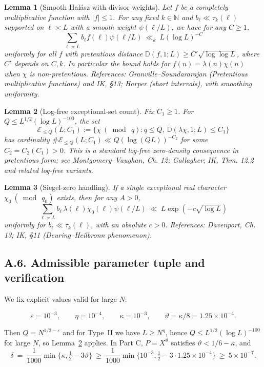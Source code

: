 \documentclass[11pt]{article}
\newtheorem{lemma}{Lemma}[section]
\theoremstyle{definition}
\theoremstyle{remark}
\begin{document}
\begin{lemma}[Smooth Hal\'asz with divisor weights]\label{lem:halasz-smooth}
	Let $f$ be a completely multiplicative function with $|f|\le 1$. For any fixed $k\in\mathbb N$ and $b_\ell\ll \tau_k(\ell)$ supported on $\ell\asymp L$ with a smooth weight $\psi(\ell/L)$, we have for any $C\ge 1$,
	\[
		\sum_{\ell\asymp L} b_\ell f(\ell)\psi(\ell/L)\ \ll_{k}\ L(\log L)^{-C}
	\]
	uniformly for all $f$ with pretentious distance $\mathbb D(f,1;L)\ge C'\sqrt{\log\log L}$, where $C'$ depends on $C,k$. In particular the bound holds for $f(n)=\lambda(n)\chi(n)$ when $\chi$ is non-pretentious. References: Granville--Soundararajan (Pretentious multiplicative functions) and IK, §13; Harper (short intervals), with smoothing uniformity.
\end{lemma}

\begin{lemma}[Log-free exceptional-set count]\label{lem:logfree-density}
	Fix $C_1\ge 1$. For $Q\le L^{1/2}(\log L)^{-100}$, the set
	\[
		\mathcal E_{\le Q}(L;C_1):=\{\chi\ (\bmod\ q): q\le Q,\ \mathbb D(\lambda\chi,1;L)\le C_1\}
	\]
	has cardinality $\#\mathcal E_{\le Q}(L;C_1)\ll Q(\log (QL))^{-C_2}$ for some $C_2=C_2(C_1)>0$. This is a standard log-free zero-density consequence in pretentious form; see Montgomery--Vaughan, Ch. 12; Gallagher; IK, Thm. 12.2 and related log-free variants.
\end{lemma}

\begin{lemma}[Siegel-zero handling]\label{lem:siegel}
	If a single exceptional real character $\chi_0\ (\bmod\ q_0)$ exists, then for any $A>0$,
	\[
		\sum_{\ell\asymp L} b_\ell\,\lambda(\ell)\chi_0(\ell)\psi(\ell/L)\ \ll\ L\exp(-c\sqrt{\log L})
	\]
	uniformly for $b_\ell\ll \tau_k(\ell)$, with an absolute $c>0$. References: Davenport, Ch. 13; IK, §11 (Deuring--Heilbronn phenomenon).
\end{lemma}

\subsection*{A.6. Admissible parameter tuple and verification}

We fix explicit values valid for large $N$:

\[
	\varepsilon=10^{-3},\qquad \eta=10^{-4},\qquad \kappa=10^{-3},\qquad \vartheta=\kappa/8=1.25\times 10^{-4}.
\]

Then $Q=N^{1/2-\varepsilon}$ and for Type~II we have $L\ge N^{\eta}$, hence $Q\le L^{1/2}(\log L)^{-100}$ for large $N$, so Lemma~\ref{lem:logfree-density} applies. In Part C, $P=X^{\vartheta}$ satisfies $\vartheta<1/6-\kappa$, and
\[
	\delta\ =\ \frac1{1000}\min\{\kappa,\tfrac12-3\vartheta\}\ \ge\ \frac{1}{1000}\min\{10^{-3},\tfrac12-3\cdot 1.25\times 10^{-4}\}\ \ge\ 5\times 10^{-7}.
\]
\end{document}
